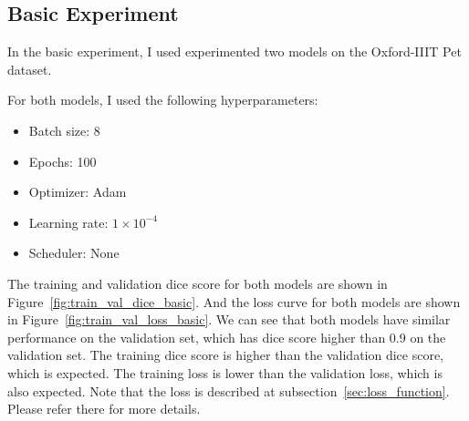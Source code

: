 \subsection{Basic Experiment}

In the basic experiment, I used experimented two models on the Oxford-IIIT Pet dataset.

For both models, I used the following hyperparameters:
\begin{itemize}
    \item Batch size: 8
    \item Epochs: 100
    \item Optimizer: Adam
    \item Learning rate: $1 \times 10^{-4}$
    \item Scheduler: None
\end{itemize}


The training and validation dice score for both models are shown in Figure~\ref{fig:train_val_dice_basic}.
And the loss curve for both models are shown in Figure~\ref{fig:train_val_loss_basic}.
We can see that both models have similar performance on the validation set, which has dice score higher than 0.9 on the validation set.
The training dice score is higher than the validation dice score, which is expected.
The training loss is lower than the validation loss, which is also expected.
Note that the loss is described at subsection~\ref{sec:loss_function}.
Please refer there for more details.

